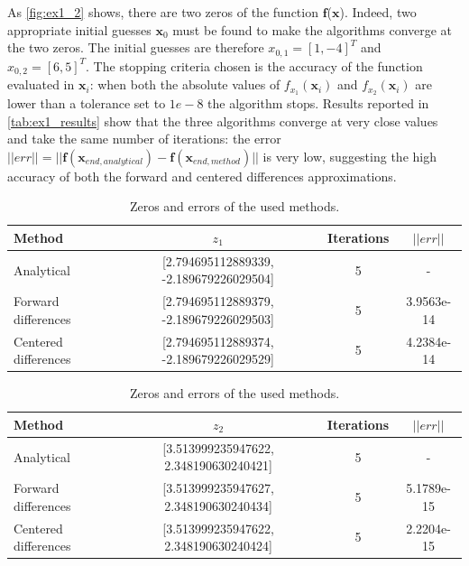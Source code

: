 \documentclass[11pt,a4paper,oneside]{article}
\renewcommand{\vec}[1]{\mathbf{#1}}
\begin{document}
As \autoref{fig:ex1_2} shows, there are two zeros of the function $\vec{f}$($\vec{x}$). 
Indeed, two appropriate initial guesses $\vec{x}_0$ must be found to make the algorithms converge 
at the two zeros. The initial guesses are therefore $x_{0,1}={[1, -4]}^T$ and $x_{0,2}={[6, 5]}^T$. 
The stopping criteria chosen is the accuracy of the function evaluated in $\vec{x}_i$: when both 
the absolute values of $f_{x_1}(\vec{x}_i)$ and $f_{x_2}(\vec{x}_i)$ are lower than a tolerance set to ${1e-8}$ 
the algorithm stops. Results reported in \autoref{tab:ex1_results} show that the three algorithms 
converge at very close values and take the same number of iterations: the error 
$||err||=||\vec{f}(\vec{x}_{end,analytical}) - \vec{f}(\vec{x}_{end,method})||$ is very low, 
suggesting the high accuracy of both the forward and centered differences approximations.
\begin{table}[ht]
    \centering
    \begin{tabular}{l|c c c}
        \textbf{Method} & \mbox{\boldmath$z_1$} & \textbf{Iterations} &  \mbox{\boldmath$||err||$} \\
        \midrule
        \midrule
        Analytical                  & [2.794695112889339, -2.189679226029504]  & 5 & -\\
        Forward differences         & [2.794695112889379, -2.189679226029503]  & 5 & 3.9563e-14\\
        Centered differences        & [2.794695112889374, -2.189679226029529]  & 5 & 4.2384e-14\\
        \toprule
    \end{tabular}
    \begin{tabular}{l|c c c}
        \textbf{Method} & \mbox{\boldmath$z_2$} & \textbf{Iterations} &  \mbox{\boldmath$||err||$} \\
        \midrule
        \midrule
        Analytical                  & [3.513999235947622, 2.348190630240421]  & 5 & -\\
        Forward differences         & [3.513999235947627, 2.348190630240434]  & 5 & 5.1789e-15\\
        Centered differences        & [3.513999235947622, 2.348190630240424]  & 5 & 2.2204e-15\\
    \end{tabular}
    \caption{Zeros and errors of the used methods.}\label{tab:ex1_results}
\end{table}


\end{document}
